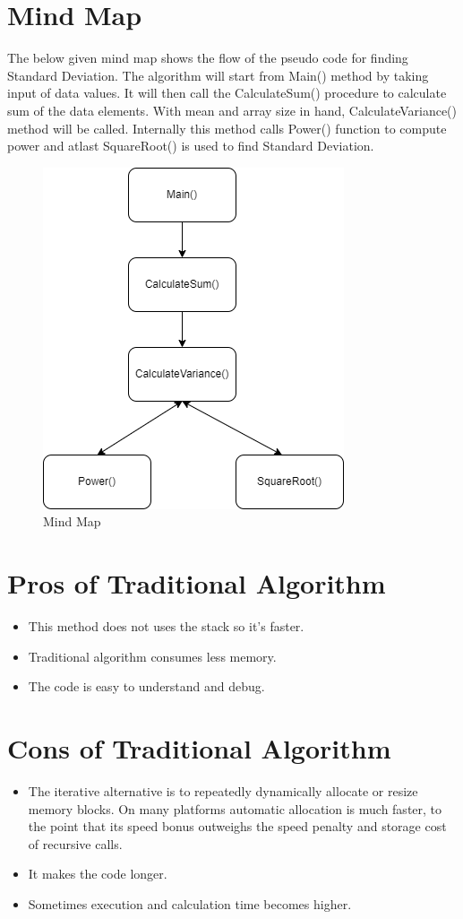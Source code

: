 \documentclass[12pt,a4paper]{report}
\begin{document}
\section*{Mind Map}
The below given mind map shows the flow of the pseudo code for finding Standard Deviation. The algorithm will start from Main() method by taking input of data values. It will then call the CalculateSum() procedure to calculate sum of the data elements. With mean and array size in hand, CalculateVariance() method will be called. Internally this method calls Power() function to compute power and atlast SquareRoot() is used to find Standard Deviation.\\  
\begin{figure}[h]
    \centering
    \includegraphics{Images/mindmap.png}
    \caption{Mind Map}
    \label{fig:Mind Map Image}
\end{figure}
\newpage
\section*{Pros of Traditional Algorithm}
\begin{itemize}
        \item This method does not uses the stack so it's faster.
        \item Traditional algorithm consumes less memory.
        \item The code is easy to understand and debug.
    \end{itemize}
\section*{Cons of Traditional Algorithm}
\begin{itemize}
        \item The iterative alternative is to repeatedly dynamically allocate or resize memory blocks. On many platforms automatic allocation is much faster, to the point that its speed bonus outweighs the speed penalty and storage cost of recursive calls.
        \item It makes the code longer.
        \item Sometimes execution and calculation time becomes higher.
    \end{itemize}
\end{document}

